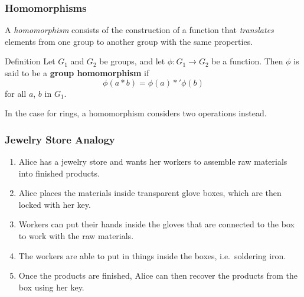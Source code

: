 \documentclass{beamer}
\begin{document}
\begin{frame}
\frametitle{Homomorphisms}

A \emph{homomorphism} consists of the construction of a function that \emph{translates} elements from one group to another group with the same properties.

\begin{block}{Definition}
Let $G_{1}$ and $G_{2}$ be groups, and let $\phi: G_{1} \rightarrow G_{2}$ be a function. Then $\phi$ is said to be a \textbf{group homomorphism} if
\begin{equation}
\phi(a*b) = \phi(a) *' \phi(b)
\end{equation}
for all $a$, $b$ in $G_{1}$.
\end{block}

In the case for rings, a homomorphism considers two operations instead.

\end{frame}
\begin{frame}
\frametitle{Jewelry Store Analogy}

\begin{enumerate}
  \setlength\itemsep{1.5em}
\item Alice has a jewelry store and wants her workers to assemble raw materials into finished products.
\item Alice places the materials inside transparent glove boxes, which are then locked with her key.
\item Workers can put their hands inside the gloves that are connected to the box to work with the raw materials. 
\item The workers are able to put in things inside the boxes, i.e.\ soldering iron. 
\item Once the products are finished, Alice can then recover the products from the box using her key. 
\end{enumerate}

\end{frame}

\end{document}
